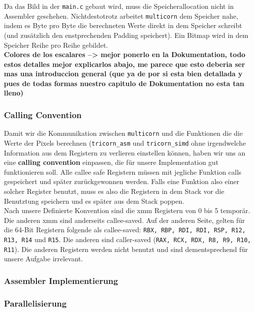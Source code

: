 \documentclass[course=erap]{aspdoc}
\begin{document}
Da das Bild in der \lstinline{main.c} gebaut wird, muss die Speicherallocation nicht in Assembler geschehen. Nichtdestotrotz arbeitet \lstinline{multicorn} dem Speicher nahe, indem es Byte pro Byte die berechneten Werte direkt in dem Speicher schreibt (und zus\"atzlich den enstprechenden Padding speichert). Ein Bitmap wird in dem Speicher Reihe pro Reihe gebildet. \\

\textbf{Colores de los escalares --> mejor ponerlo en la Dokumentation, todo estos detalles mejor explicarlos abajo, me parece que esto deberia ser mas una introduccion general (que ya de por si esta bien detallada y pues de todas formas nuestro capitulo de Dokumentation no esta tan lleno)}\\

\subsubsection{Calling Convention}

Damit wir die Kommunikation zwischen \lstinline{multicorn} und die Funktionen die die Werte der Pixels berechnen (\lstinline{tricorn_asm} und \lstinline{tricorn_simd} ohne irgendwelche Information aus dem Registern zu verlieren einstellen k\"onnen, haben wir uns an eine \textbf{calling convention} einpassen, die f\"ur unsere Implementation gut funktionieren soll. Alle callee safe Registern m\"ussen mit jegliche Funktion calls gespeichert und sp\"ater zur\"uckgewonnen werden. Falls eine Funktion also einer solcher Register benutzt, muss es also die Registern in dem Stack vor die Benutztung speichern und es sp\"ater aus dem Stack poppen. \\

Nach unsere Definierte Konvention sind die xmm Registern von 0 bis 5 tempor\"ar. Die anderen xmm sind anderseits callee-saved. Auf der anderen Seite, gelten f\"ur die 64-Bit Registern folgende als callee-saved: \lstinline{RBX, RBP, RDI, RDI, RSP, R12, R13, R14} und \lstinline{R15}. Die anderen sind caller-saved (\lstinline{RAX, RCX, RDX, R8, R9, R10, R11}). Die anderen Registern werden nicht benutzt und sind dementsprechend f\"ur unsere Aufgabe irrelevant. 

\subsubsection{Assembler Implementierung}

\subsubsection{Parallelisierung}
\end{document}
